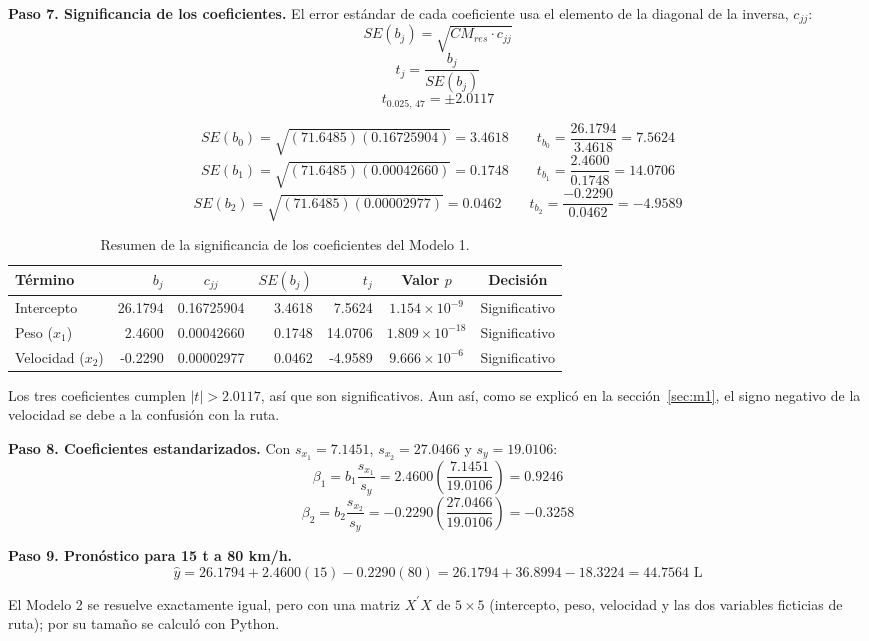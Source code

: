 \documentclass[12pt,letterpaper]{article}
\newcommand{\paren}[1]{\left(#1\right)}
\begin{document}
\textbf{Paso 7. Significancia de los coeficientes.} El error estándar de cada coeficiente usa el elemento de la diagonal de la inversa, $c_{jj}$:
$$ SE(b_j) = \sqrt{CM_{res} \cdot c_{jj}} $$
$$ t_j = \frac{b_j}{SE(b_j)} $$
$$ t_{0.025,\,47} = \pm 2.0117 $$

$$ SE(b_0) = \sqrt{(71.6485)(0.16725904)} = 3.4618 \qquad t_{b_0} = \frac{26.1794}{3.4618} = 7.5624 $$
$$ SE(b_1) = \sqrt{(71.6485)(0.00042660)} = 0.1748 \qquad t_{b_1} = \frac{2.4600}{0.1748} = 14.0706 $$
$$ SE(b_2) = \sqrt{(71.6485)(0.00002977)} = 0.0462 \qquad t_{b_2} = \frac{-0.2290}{0.0462} = -4.9589 $$

\begin{table}[H]
\centering
\caption{Resumen de la significancia de los coeficientes del Modelo 1.}
\begin{tabular}{lrcrrcc}
\toprule
Término & $b_j$ & $c_{jj}$ & $SE(b_j)$ & $t_j$ & Valor $p$ & Decisión \\
\midrule
Intercepto & 26.1794 & 0.16725904 & 3.4618 & 7.5624 & $1.154 \times 10^{-9}$ & Significativo \\
Peso ($x_1$) & 2.4600 & 0.00042660 & 0.1748 & 14.0706 & $1.809 \times 10^{-18}$ & Significativo \\
Velocidad ($x_2$) & -0.2290 & 0.00002977 & 0.0462 & -4.9589 & $9.666 \times 10^{-6}$ & Significativo \\
\bottomrule
\end{tabular}
\end{table}

Los tres coeficientes cumplen $|t| > 2.0117$, así que son significativos. Aun así, como se explicó en la sección~\ref{sec:m1}, el signo negativo de la velocidad se debe a la confusión con la ruta.

\textbf{Paso 8. Coeficientes estandarizados.} Con $s_{x_1} = 7.1451$, $s_{x_2} = 27.0466$ y $s_y = 19.0106$:
$$ \beta_1 = b_1\frac{s_{x_1}}{s_y} = 2.4600\paren{\frac{7.1451}{19.0106}} = 0.9246 $$
$$ \beta_2 = b_2\frac{s_{x_2}}{s_y} = -0.2290\paren{\frac{27.0466}{19.0106}} = -0.3258 $$

\textbf{Paso 9. Pronóstico para 15 t a 80 km/h.}
$$ \hat{y} = 26.1794 + 2.4600(15) - 0.2290(80) = 26.1794 + 36.8994 - 18.3224 = 44.7564 \text{ L} $$

El Modelo 2 se resuelve exactamente igual, pero con una matriz $X^{\prime}X$ de $5 \times 5$ (intercepto, peso, velocidad y las dos variables ficticias de ruta); por su tamaño se calculó con Python.
\end{document}
